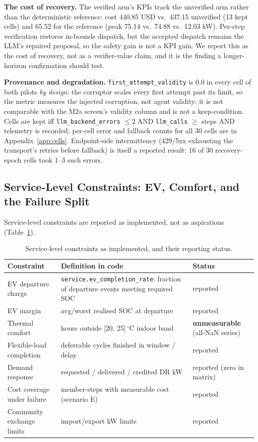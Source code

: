\documentclass[11pt,a4paper]{article}
\begin{document}
\textbf{The cost of recovery.} The verified arm's KPIs track the unverified
arm rather than the deterministic reference: cost 440.85 USD vs.\ 437.15
unverified (13 kept cells) and 65.52 for the reference (peak 75.14 vs.\ 74.88
vs.\ 12.03 kW). Per-step verification restores in-bounds dispatch, but the
accepted dispatch remains the LLM's repaired proposal, so the safety gain is
not a KPI gain. We report this as the cost of recovery, not as a
verifier-value claim, and it is the finding a longer-horizon confirmation
should test.

\textbf{Provenance and degradation.} \texttt{first\_attempt\_validity} is 0.0
in every cell of both pilots \emph{by design}: the corruptor scales every
first attempt past its limit, so the metric measures the injected corruption,
not agent validity; it is not comparable with the M2a screen's validity column
and is not a keep-condition. Cells are kept iff \texttt{llm\_backend\_errors}
$\leq 2$ AND \texttt{llm\_calls} $\geq$ steps AND telemetry is recorded;
per-cell error and fallback counts for all 30 cells are in
Appendix~\ref{app:cells}. Endpoint-side intermittency (429/5xx
exhausting the transport's retries before fallback) is itself a reported
result: 16 of 30 recovery-epoch cells took 1--3 such errors.

\subsection{Service-Level Constraints: EV, Comfort, and the Failure Split}
\label{sec:service}

Service-level constraints are reported as implemented, not as aspirations
(Table~\ref{tab:service}).

\begin{table}[htbp]
\centering
\caption{Service-level constraints as implemented, and their reporting status.}
\label{tab:service}
\begin{tabular}{p{4.2cm}p{6.2cm}p{4.2cm}}
\toprule
Constraint & Definition in code & Status \\
\midrule
EV departure charge & \texttt{service.ev\_completion\_rate}: fraction of departure events meeting required SOC & reported \\
EV margin & avg/worst realised SOC at departure & reported \\
Thermal comfort & hours outside [20, 25]\,$^\circ$C indoor band & \textbf{unmeasurable} (all-NaN series) \\
Flexible-load completion & deferrable cycles finished in window / delay & reported \\
Demand response & requested / delivered / credited DR kW & reported (zero in matrix) \\
Cost coverage under failure & member-steps with measurable cost (scenario E) & reported \\
Community exchange limits & import/export kW limits & reported \\
\midrule
\end{tabular}
\end{table}
\end{document}
